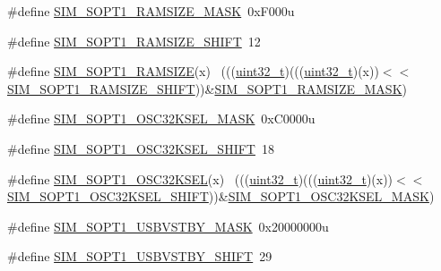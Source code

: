 \begin{DoxyCompactItemize}
\item 
\#define \hyperlink{group___s_i_m___register___masks_ga9fbcfd0b3e4fb08ee733dee975a5df29}{S\+I\+M\+\_\+\+S\+O\+P\+T1\+\_\+\+R\+A\+M\+S\+I\+Z\+E\+\_\+\+M\+A\+SK}~0x\+F000u
\item 
\#define \hyperlink{group___s_i_m___register___masks_ga4100f9e8e8ffc766ac1ac6493379b8dc}{S\+I\+M\+\_\+\+S\+O\+P\+T1\+\_\+\+R\+A\+M\+S\+I\+Z\+E\+\_\+\+S\+H\+I\+FT}~12
\item 
\#define \hyperlink{group___s_i_m___register___masks_gaf9b9b3caaa8087f8530f5c2d1418e7b0}{S\+I\+M\+\_\+\+S\+O\+P\+T1\+\_\+\+R\+A\+M\+S\+I\+ZE}(x)                                      ~(((\hyperlink{_p_e___types_8h_a33594304e786b158f3fb30289278f5af}{uint32\+\_\+t})(((\hyperlink{_p_e___types_8h_a33594304e786b158f3fb30289278f5af}{uint32\+\_\+t})(x))$<$$<$\hyperlink{group___s_i_m___register___masks_ga4100f9e8e8ffc766ac1ac6493379b8dc}{S\+I\+M\+\_\+\+S\+O\+P\+T1\+\_\+\+R\+A\+M\+S\+I\+Z\+E\+\_\+\+S\+H\+I\+FT}))\&\hyperlink{group___s_i_m___register___masks_ga9fbcfd0b3e4fb08ee733dee975a5df29}{S\+I\+M\+\_\+\+S\+O\+P\+T1\+\_\+\+R\+A\+M\+S\+I\+Z\+E\+\_\+\+M\+A\+SK})
\item 
\#define \hyperlink{group___s_i_m___register___masks_ga5c660cd4a6d8062e6ef4afbc17c27fa4}{S\+I\+M\+\_\+\+S\+O\+P\+T1\+\_\+\+O\+S\+C32\+K\+S\+E\+L\+\_\+\+M\+A\+SK}~0x\+C0000u
\item 
\#define \hyperlink{group___s_i_m___register___masks_gac9e930c4ee375a2aee6fa6c97e061226}{S\+I\+M\+\_\+\+S\+O\+P\+T1\+\_\+\+O\+S\+C32\+K\+S\+E\+L\+\_\+\+S\+H\+I\+FT}~18
\item 
\#define \hyperlink{group___s_i_m___register___masks_ga7bede429b5cc2fda927f328ecd9ebd72}{S\+I\+M\+\_\+\+S\+O\+P\+T1\+\_\+\+O\+S\+C32\+K\+S\+EL}(x)                                  ~(((\hyperlink{_p_e___types_8h_a33594304e786b158f3fb30289278f5af}{uint32\+\_\+t})(((\hyperlink{_p_e___types_8h_a33594304e786b158f3fb30289278f5af}{uint32\+\_\+t})(x))$<$$<$\hyperlink{group___s_i_m___register___masks_gac9e930c4ee375a2aee6fa6c97e061226}{S\+I\+M\+\_\+\+S\+O\+P\+T1\+\_\+\+O\+S\+C32\+K\+S\+E\+L\+\_\+\+S\+H\+I\+FT}))\&\hyperlink{group___s_i_m___register___masks_ga5c660cd4a6d8062e6ef4afbc17c27fa4}{S\+I\+M\+\_\+\+S\+O\+P\+T1\+\_\+\+O\+S\+C32\+K\+S\+E\+L\+\_\+\+M\+A\+SK})
\item 
\#define \hyperlink{group___s_i_m___register___masks_gaaf0b406e4bd1800083f48727a7cde829}{S\+I\+M\+\_\+\+S\+O\+P\+T1\+\_\+\+U\+S\+B\+V\+S\+T\+B\+Y\+\_\+\+M\+A\+SK}~0x20000000u
\item 
\#define \hyperlink{group___s_i_m___register___masks_gae945165e21faf14e58288bce0918482a}{S\+I\+M\+\_\+\+S\+O\+P\+T1\+\_\+\+U\+S\+B\+V\+S\+T\+B\+Y\+\_\+\+S\+H\+I\+FT}~29

\end{DoxyCompactItemize}

